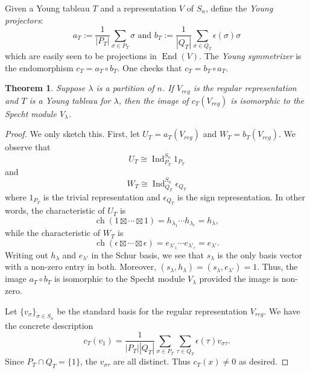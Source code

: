 \documentclass[12pt]{article}
\theoremstyle{plain}
\newtheorem{theorem}{Theorem}[section]
\theoremstyle{definition}
\theoremstyle{remark}
\numberwithin{equation}{section}
\begin{document}
Given a Young tableau $T$ and a representation $V$ of $S_n$,
define the \emph{Young projectors}:
\[
a_T := \frac{1}{|P_T|}\sum_{\sigma \in P_T} \sigma
\textrm{ and }
b_T := \frac{1}{|Q_T|}\sum_{\sigma \in Q_T} \epsilon(\sigma)\sigma
\]
which are easily seen to be projections in $\operatorname{End}(V)$.
The \emph{Young symmetrizer} is the endomorphism $c_T = a_T \circ b_T$.
One checks that $c_T = b_T \circ a_T$.

\begin{theorem}
Suppose $\lambda$ is a partition of $n$.
If $V_{reg}$ is the regular representation and $T$ is a Young tableau
for $\lambda$, then the image of $c_T(V_{reg})$ is isomorphic to the
Specht module $V_\lambda$.
\end{theorem}

\begin{proof}
We only sketch this.
First, let $U_T = a_T(V_{reg})$ and $W_T = b_T(V_{reg})$.
We observe that
\[
U_T \cong \operatorname{Ind}_{P_T}^{S_n} 1_{P_T}
\]
and
\[
W_T \cong \operatorname{Ind}_{Q_T}^{S_n} \epsilon_{Q_T}
\]
where $1_{P_T}$ is the trivial representation and $\epsilon_{Q_T}$ is the sign
representation.
In other words, the characteristic of $U_T$ is
\[
\operatorname{ch}(1 \boxtimes \cdots \boxtimes 1)
= h_{\lambda_1} \cdots h_{\lambda_r} = h_\lambda,
\]
while the characteristic of $W_T$ is
\[
\operatorname{ch}(\epsilon \boxtimes \cdots \boxtimes \epsilon)
= e_{\lambda'_1} \cdots e_{\lambda'_r} = e_{\lambda'}.
\]
Writing out $h_\lambda$ and $e_{\lambda'}$ in the Schur basis,
we see that $s_\lambda$ is the only basis vector with a non-zero entry
in both.
Moreover, $(s_\lambda,h_\lambda)=(s_\lambda,e_{\lambda'})=1$.
Thus, the image $a_T \circ b_T$ is isomorphic to the Specht module
$V_\lambda$ provided the image is non-zero.

Let $\{ v_\sigma \}_{\sigma \in S_n}$ be the standard basis for the regular
representation $V_{reg}$.
We have the concrete description
\[
c_T(v_{1})  = \frac{1}{|P_T| |Q_T|}\sum_{\sigma \in P_T}\sum_{\tau \in Q_T}
\epsilon(\tau) v_{\sigma\tau} .
\]
Since $P_T \cap Q_T = \{1\}$, the $v_{\sigma\tau}$ are all distinct.
Thus $c_T(x) \ne 0$ as desired.
\end{proof}



\end{document}
